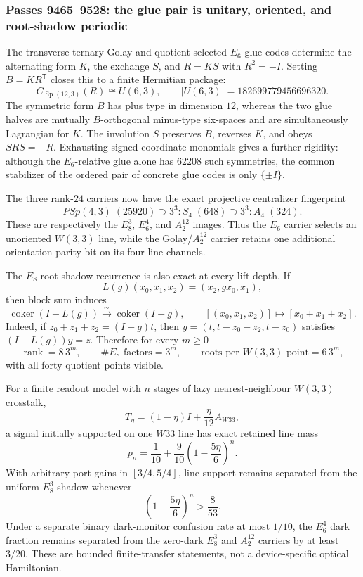 \subsubsection*{Passes 9465--9528: the glue pair is unitary, oriented, and root-shadow periodic}
The transverse ternary Golay and quotient-selected $E_6$ glue codes determine the
alternating form $K$, the exchange $S$, and $R=KS$ with $R^2=-I$.  Setting
$B=KR^{\mathsf T}$ closes this to a finite Hermitian package:
\[
 C_{\operatorname{Sp}(12,3)}(R)\cong U(6,3),\qquad
 |U(6,3)|=182699779456696320.
\]
The symmetric form $B$ has plus type in dimension $12$, whereas the two glue
halves are mutually $B$-orthogonal minus-type six-spaces and are simultaneously
Lagrangian for $K$.  The involution $S$ preserves $B$, reverses $K$, and obeys
$SRS=-R$.  Exhausting signed coordinate monomials gives a further rigidity:
although the $E_6$-relative glue alone has $62208$ such symmetries, the common
stabilizer of the ordered pair of concrete glue codes is only $\{\pm I\}$.

The three rank-$24$ carriers now have the exact projective centralizer fingerprint
\[
\boxed{
 PSp(4,3)\;(25920)
 \supset
 3^3{:}S_4\;(648)
 \supset
 3^3{:}A_4\;(324)}.
\]
These are respectively the $E_8^3$, $E_6^4$, and $A_2^{12}$ images.  Thus the
$E_6$ carrier selects an unoriented $W(3,3)$ line, while the Golay/$A_2^{12}$
carrier retains one additional orientation-parity bit on its four line channels.

The $E_8$ root-shadow recurrence is also exact at every lift depth.  If
\[
 L(g)(x_0,x_1,x_2)=(x_2,gx_0,x_1),
\]
then block sum induces
\[
 \operatorname{coker}(I-L(g))\xrightarrow{\sim}\operatorname{coker}(I-g),
 \qquad [(x_0,x_1,x_2)]\mapsto[x_0+x_1+x_2].
\]
Indeed, if $z_0+z_1+z_2=(I-g)t$, then
$y=(t,t-z_0-z_2,t-z_0)$ satisfies $(I-L(g))y=z$.  Therefore for every $m\ge0$
\[
 \operatorname{rank}=8\,3^m,\qquad
 \#E_8\text{ factors}=3^m,\qquad
 \boxed{\text{roots per }W(3,3)\text{ point}=6\,3^m},
\]
with all forty quotient points visible.

For a finite readout model with $n$ stages of lazy nearest-neighbour $W(3,3)$
crosstalk,
\[
 T_\eta=(1-\eta)I+\frac{\eta}{12}A_{W33},
\]
a signal initially supported on one $W33$ line has exact retained line mass
\[
 p_n=\frac1{10}+\frac9{10}\left(1-\frac{5\eta}{6}\right)^n.
\]
With arbitrary port gains in $[3/4,5/4]$, line support remains separated from
the uniform $E_8^3$ shadow whenever
\[
 \left(1-\frac{5\eta}{6}\right)^n>\frac8{53}.
\]
Under a separate binary dark-monitor confusion rate at most $1/10$, the
$E_6^4$ dark fraction remains separated from the zero-dark $E_8^3$ and
$A_2^{12}$ carriers by at least $3/20$.  These are bounded finite-transfer
statements, not a device-specific optical Hamiltonian.

